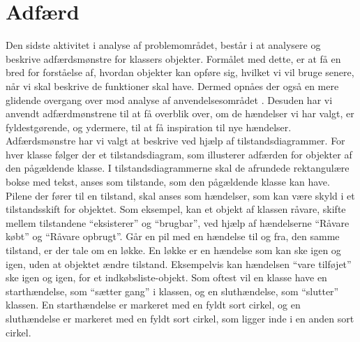 \section{Adfærd}
\label{sec:adfaerd}

Den sidste aktivitet i analyse af problemområdet, består i at analysere og beskrive adfærdsmønstre for klassers objekter. Formålet med dette, er at få en bred for forståelse af, hvordan objekter kan opføre sig, hvilket vi vil bruge senere, når vi skal beskrive de funktioner \Foodl{} skal have. Dermed opnåes der også en mere glidende overgang over mod analyse af anvendelsesområdet . Desuden har vi anvendt adfærdmønstrene til at få overblik over, om de hændelser vi har valgt, er fyldestgørende, og ydermere, til at få inspiration til nye hændelser. Adfærdsmønstre har vi valgt at beskrive ved hjælp af tilstandsdiagrammer. For hver klasse følger der et tilstandsdiagram, som illusterer adfærden for objekter af den pågældende klasse. I tilstandsdiagrammerne skal de afrundede rektangulære bokse med tekst, anses som tilstande, som den pågældende klasse kan have. Pilene der fører til en tilstand, skal anses som hændelser, som kan være skyld i et tilstandsskift for objektet. Som eksempel, kan et objekt af klassen råvare, skifte mellem tilstandene ``eksisterer'' og ``brugbar'', ved hjælp af hændelserne ``Råvare købt'' og ``Råvare opbrugt''. Går en pil med en hændelse til og fra, den samme tilstand, er der tale om en løkke. En løkke er en hændelse som kan ske igen og igen, uden at objektet ændre tilstand. Eksempelvis kan hændelsen ``vare tilføjet'' ske igen og igen, for et indkøbsliste-objekt. Som oftest vil en klasse have en starthændelse, som ``sætter gang'' i klassen, og en sluthændelse, som ``slutter'' klassen. En starthændelse er markeret med en fyldt sort cirkel, og en sluthændelse er markeret med en fyldt sort cirkel, som ligger inde i en anden sort cirkel.


%



%


